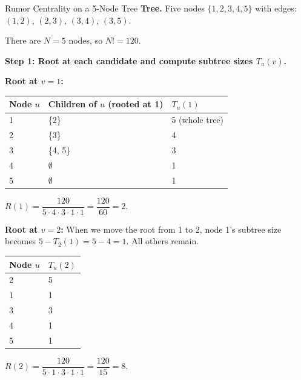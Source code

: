 \begin{examplebox}{Rumor Centrality on a 5-Node Tree}
\textbf{Tree.} Five nodes $\{1, 2, 3, 4, 5\}$ with edges:
$(1,2)$, $(2,3)$, $(3,4)$, $(3,5)$.

\begin{center}
\end{center}

There are $N = 5$ nodes, so $N! = 120$.

\medskip
\textbf{Step 1: Root at each candidate and compute subtree sizes $T_u(v)$.}

\medskip
\textbf{Root at $v = 1$:}
\begin{center}
\small
\begin{tabular}{lll}
\toprule
Node $u$ & Children of $u$ (rooted at 1) & $T_u(1)$ \\
\midrule
1 & \{2\}     & 5 (whole tree) \\
2 & \{3\}     & 4 \\
3 & \{4, 5\}  & 3 \\
4 & $\emptyset$ & 1 \\
5 & $\emptyset$ & 1 \\
\bottomrule
\end{tabular}
\end{center}
$R(1) = \dfrac{120}{5 \cdot 4 \cdot 3 \cdot 1 \cdot 1} = \dfrac{120}{60} = 2$.

\medskip
\textbf{Root at $v = 2$:}
When we move the root from 1 to 2, node 1's subtree size becomes $5 - T_2(1) = 5 - 4 = 1$.
All others remain.
\begin{center}
\small
\begin{tabular}{ll}
\toprule
Node $u$ & $T_u(2)$ \\
\midrule
2 & 5 \\
1 & 1 \\
3 & 3 \\
4 & 1 \\
5 & 1 \\
\bottomrule
\end{tabular}
\end{center}
$R(2) = \dfrac{120}{5 \cdot 1 \cdot 3 \cdot 1 \cdot 1} = \dfrac{120}{15} = 8$.


\end{examplebox}
